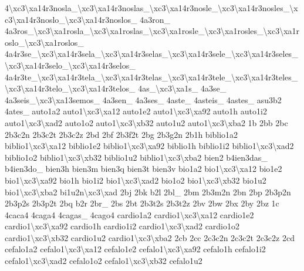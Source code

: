 {4\textbackslash{}xc3\textbackslash{}xa14r3nosla\-\_\textbackslash{}xc3\textbackslash{}xa14r3noslas\-\_\textbackslash{}xc3\textbackslash{}xa14r3nosle\-\_\textbackslash{}xc3\textbackslash{}xa14r3nosles\-\_\textbackslash{}xc3\textbackslash{}xa14r3noslo\-\_\textbackslash{}xc3\textbackslash{}xa14r3noslos\-\_\- 4a3ron\-\_\- 4a3ros\-\_\textbackslash{}xc3\textbackslash{}xa1rosla\-\_\textbackslash{}xc3\textbackslash{}xa1roslas\-\_\textbackslash{}xc3\textbackslash{}xa1rosle\-\_\textbackslash{}xc3\textbackslash{}xa1rosles\-\_\textbackslash{}xc3\textbackslash{}xa1roslo\-\_\textbackslash{}xc3\textbackslash{}xa1roslos\-\_\- 4a4r3se\-\_\textbackslash{}xc3\textbackslash{}xa14r3sela\-\_\textbackslash{}xc3\textbackslash{}xa14r3selas\-\_\textbackslash{}xc3\textbackslash{}xa14r3sele\-\_\textbackslash{}xc3\textbackslash{}xa14r3seles\-\_\textbackslash{}xc3\textbackslash{}xa14r3selo\-\_\textbackslash{}xc3\textbackslash{}xa14r3selos\-\_\- 4a4r3te\-\_\textbackslash{}xc3\textbackslash{}xa14r3tela\-\_\textbackslash{}xc3\textbackslash{}xa14r3telas\-\_\textbackslash{}xc3\textbackslash{}xa14r3tele\-\_\textbackslash{}xc3\textbackslash{}xa14r3teles\-\_\textbackslash{}xc3\textbackslash{}xa14r3telo\-\_\textbackslash{}xc3\textbackslash{}xa14r3telos\-\_\- 4as\-\_\textbackslash{}xc3\textbackslash{}xa1s\-\_\- 4a3se\-\_\- 4a3seis\-\_\textbackslash{}xc3\textbackslash{}xa13semos\-\_\- 4a3sen\-\_\- 4a3ses\-\_\- 4aste\-\_\- 4asteis\-\_\- 4astes\-\_\- asu3b2 4ates\-\_\- auto1a2 auto1\textbackslash{}xc3\textbackslash{}xa12 auto1e2 auto1\textbackslash{}xc3\textbackslash{}xa92 auto1h auto1i2 auto1\textbackslash{}xc3\textbackslash{}xad2 auto1o2 auto1\textbackslash{}xc3\textbackslash{}xb32 auto1u2 auto1\textbackslash{}xc3\textbackslash{}xba2 1b 2bb 2bc 2b3c2n 2b3c2t 2b3c2z 2bd 2bf 2b3f2t 2bg 2b3g2n 2b1h biblio1a2 biblio1\textbackslash{}xc3\textbackslash{}xa12 biblio1e2 biblio1\textbackslash{}xc3\textbackslash{}xa92 biblio1h biblio1i2 biblio1\textbackslash{}xc3\textbackslash{}xad2 biblio1o2 biblio1\textbackslash{}xc3\textbackslash{}xb32 biblio1u2 biblio1\textbackslash{}xc3\textbackslash{}xba2 bien2 b4ien3das\-\_\- b4ien3do\-\_\- bien3h bien3m bien3q bien3t bien3v bio1a2 bio1\textbackslash{}xc3\textbackslash{}xa12 bio1e2 bio1\textbackslash{}xc3\textbackslash{}xa92 bio1h bio1i2 bio1\textbackslash{}xc3\textbackslash{}xad2 bio1o2 bio1\textbackslash{}xc3\textbackslash{}xb32 bio1u2 bio1\textbackslash{}xc3\textbackslash{}xba2 bi1u2n\textbackslash{}xc3\textbackslash{}xad 2bj 2bk b2l 2bl\-\_\- 2bm 2b3m2n 2bn 2bp 2b3p2n 2b3p2s 2b3p2t 2bq b2r 2br\-\_\- 2bs 2bt 2b3t2s 2b3t2z 2bv 2bw 2bx 2by 2bz 1c 4caca4 4caga4 4cagas\-\_\- 4cago4 cardio1a2 cardio1\textbackslash{}xc3\textbackslash{}xa12 cardio1e2 cardio1\textbackslash{}xc3\textbackslash{}xa92 cardio1h cardio1i2 cardio1\textbackslash{}xc3\textbackslash{}xad2 cardio1o2 cardio1\textbackslash{}xc3\textbackslash{}xb32 cardio1u2 cardio1\textbackslash{}xc3\textbackslash{}xba2 2cb 2cc 2c3c2n 2c3c2t 2c3c2z 2cd cefalo1a2 cefalo1\textbackslash{}xc3\textbackslash{}xa12 cefalo1e2 cefalo1\textbackslash{}xc3\textbackslash{}xa92 cefalo1h cefalo1i2 cefalo1\textbackslash{}xc3\textbackslash{}xad2 cefalo1o2 cefalo1\textbackslash{}xc3\textbackslash{}xb32 cefalo1u2 }
